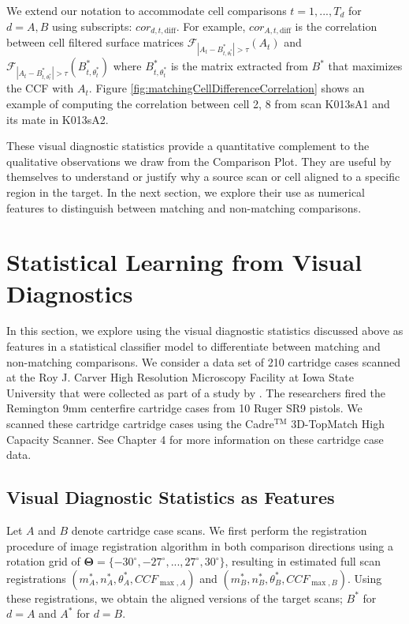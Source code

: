 \documentclass[11pt,]{isuthesis}
\begin{document}
We extend our notation to accommodate cell comparisons \(t = 1,...,T_d\) for \(d = A,B\) using subscripts: \(cor_{d,t,\text{diff}}\).
For example, \(cor_{A,t,\text{diff}}\) is the correlation between cell filtered surface matrices \(\mathcal{F}_{|A_t - B_{t,\theta_t^*}^*| > \tau}(A_t)\) and \(\mathcal{F}_{|A_t - B_{t,\theta_t^*}^*| > \tau}(B_{t,\theta_t^*}^*)\) where \(B_{t,\theta_t^*}^*\) is the matrix extracted from \(B^*\) that maximizes the CCF with \(A_t\).
Figure \ref{fig:matchingCellDifferenceCorrelation} shows an example of computing the correlation between cell 2, 8 from scan K013sA1 and its mate in K013sA2.

These visual diagnostic statistics provide a quantitative complement to the qualitative observations we draw from the Comparison Plot.
They are useful by themselves to understand or justify why a source scan or cell aligned to a specific region in the target.
In the next section, we explore their use as numerical features to distinguish between matching and non-matching comparisons.

\hypertarget{statistical-learning-from-visual-diagnostics}{%
\section{Statistical Learning from Visual Diagnostics}\label{statistical-learning-from-visual-diagnostics}}

In this section, we explore using the visual diagnostic statistics discussed above as features in a statistical classifier model to differentiate between matching and non-matching comparisons.
We consider a data set of 210 cartridge cases scanned at the Roy J. Carver High Resolution Microscopy Facility at Iowa State University that were collected as part of a study by \citep{Baldwin2014}.
The researchers fired the Remington 9mm centerfire cartridge cases from 10 Ruger SR9 pistols.
We scanned these cartridge cartridge cases using the Cadre\(^{\text{TM}}\) 3D-TopMatch High Capacity Scanner.
See Chapter 4 for more information on these cartridge case data.

\hypertarget{visual-diagnostic-statistics-as-features}{%
\subsection{Visual Diagnostic Statistics as Features}\label{visual-diagnostic-statistics-as-features}}

Let \(A\) and \(B\) denote cartridge case scans.
We first perform the registration procedure of image registration algorithm in both comparison directions using a rotation grid of \(\pmb{\Theta} = \{-30^{\circ} , -27^{\circ}, ..., 27^{\circ}, 30^{\circ}\}\), resulting in estimated full scan registrations \((m_{A}^*, n_{A}^*, \theta_A^*, CCF_{\max,A})\) and \((m_{B}^*, n_{B}^*, \theta_B^*, CCF_{\max,B})\).
Using these registrations, we obtain the aligned versions of the target scans; \(B^*\) for \(d = A\) and \(A^*\) for \(d = B\).
\end{document}
